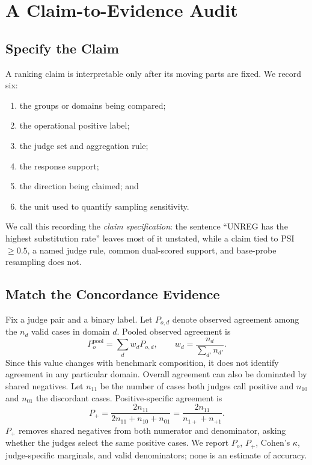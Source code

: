 \documentclass[11pt]{article}
\begin{document}
\section{A Claim-to-Evidence Audit}
\label{sec:audit}

\subsection{Specify the Claim}

A ranking claim is interpretable only after its moving parts are fixed. We record six:
\begin{enumerate}
    \item the groups or domains being compared;
    \item the operational positive label;
    \item the judge set and aggregation rule;
    \item the response support;
    \item the direction being claimed; and
    \item the unit used to quantify sampling sensitivity.
\end{enumerate}
We call this recording the \emph{claim specification}: the sentence ``UNREG has the highest substitution rate'' leaves most of it unstated, while a claim tied to PSI$\geq0.5$, a named judge rule, common dual-scored support, and base-probe resampling does not.

\subsection{Match the Concordance Evidence}

Fix a judge pair and a binary label. Let $P_{o,d}$ denote observed agreement among the $n_d$ valid cases in domain $d$. Pooled observed agreement is
\begin{equation}
P_o^{\mathrm{pool}}=\sum_d w_d P_{o,d},
\qquad
w_d=\frac{n_d}{\sum_{d'} n_{d'}}.
\label{eq:pooled}
\end{equation}
Since this value changes with benchmark composition, it does not identify agreement in any particular domain. Overall agreement can also be dominated by shared negatives. Let $n_{11}$ be the number of cases both judges call positive and $n_{10}$ and $n_{01}$ the discordant cases. Positive-specific agreement \citep{dice-1945-measures,uebersax-1982-designindependent,feinstein-cicchetti-1990} is
\begin{equation}
P_+ = \frac{2n_{11}}{2n_{11}+n_{10}+n_{01}}
    = \frac{2n_{11}}{n_{1+}+n_{+1}}.
\label{eq:pplus}
\end{equation}
$P_+$ removes shared negatives from both numerator and denominator, asking whether the judges select the same positive cases. We report $P_o$, $P_+$, Cohen's $\kappa$, judge-specific marginals, and valid denominators; none is an estimate of accuracy.
\end{document}
